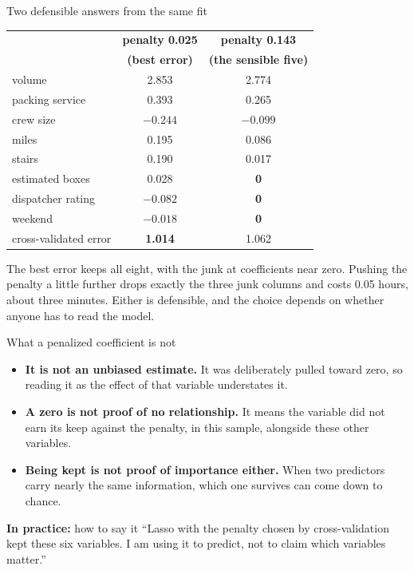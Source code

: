 \documentclass[aspectratio=169]{beamer}
\newenvironment{practice}[1]{\begin{exampleblock}{\textbf{In practice:} #1}}{\end{exampleblock}}
\begin{document}
\begin{frame}{Two defensible answers from the same fit}
\begin{center}\footnotesize
\begin{tabular}{lcc}
\toprule
& \textbf{penalty 0.025} & \textbf{penalty 0.143} \\
& \textbf{(best error)} & \textbf{(the sensible five)} \\
\midrule
volume & 2.853 & 2.774 \\
packing service & 0.393 & 0.265 \\
crew size & $-0.244$ & $-0.099$ \\
miles & 0.195 & 0.086 \\
stairs & 0.190 & 0.017 \\
estimated boxes & 0.028 & \textbf{0} \\
dispatcher rating & $-0.082$ & \textbf{0} \\
weekend & $-0.018$ & \textbf{0} \\
\midrule
cross-validated error & \textbf{1.014} & 1.062 \\
\bottomrule
\end{tabular}
\end{center}
\vspace{0.2em}
\small
The best error keeps all eight, with the junk at coefficients near zero. Pushing the penalty a
little further drops exactly the three junk columns and costs 0.05 hours, about three minutes.
Either is defensible, and the choice depends on whether anyone has to read the model.
\end{frame}

\begin{frame}{What a penalized coefficient is not}
\begin{itemize}
  \item \textbf{It is not an unbiased estimate.} It was deliberately pulled toward zero, so
        reading it as the effect of that variable understates it.
  \item \textbf{A zero is not proof of no relationship.} It means the variable did not earn its
        keep against the penalty, in this sample, alongside these other variables.
  \item \textbf{Being kept is not proof of importance either.} When two predictors carry
        nearly the same information, which one survives can come down to chance.
\end{itemize}
\begin{practice}{how to say it}
``Lasso with the penalty chosen by cross-validation kept these six variables. I am using it to
predict, not to claim which variables matter.''
\end{practice}
\end{frame}
\end{document}
